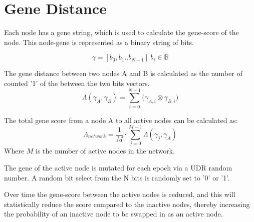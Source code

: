 \section{Gene Distance}
Each node has a gene string, which is used to calculate the gene-score of the node. This node-gene is represented as a binary string of bits.

\begin{equation}
 \gamma = [b_{0}, b_{1} .. b_{N-1}] ~ b_{i} \in \mathbb{B}
\end{equation}

The gene distance between two nodes A and B is calculated as the number of counted '1' of the  between the two bits vectors.
\begin{equation}
 \Lambda(\gamma_A,\gamma_B) = \sum_{i=0}^{N-1}{(\gamma_{A,i}} \otimes {\gamma_{B,i})}
\end{equation}

The total gene score from a node A to all active nodes can be calculated as:
\begin{equation}
 \Lambda_{network} = \frac{1}{M} \cdot \sum_{j=0}^{M-1}{\Lambda(\gamma_j, \gamma_A)}
\end{equation}
Where $M$ is the number of active nodes in the network.

The gene of the active node is mutated for each epoch via a UDR random number.
A random bit select from the N bits is randomly set to '0' or '1'.

Over time the gene-score between the active nodes is reduced, and this will statistically reduce the score compared to the inactive nodes, thereby increasing the probability of an inactive node to be swapped in as an active node.
